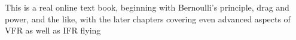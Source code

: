  \noindent
This is a real online text book, beginning with Bernoulli's principle, drag and
power, and the like, with the later chapters covering even advanced aspects of 
VFR as well as IFR flying


